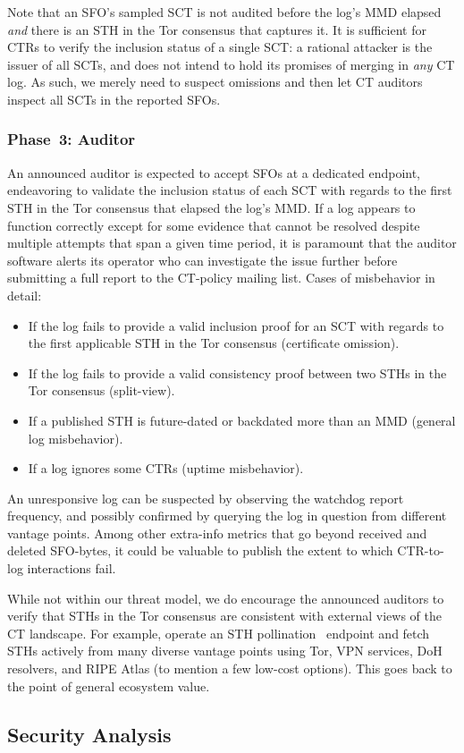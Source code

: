 Note that an SFO's sampled SCT is not audited before the log's MMD elapsed
\emph{and} there is an STH in the Tor consensus that captures it.  It is
sufficient for CTRs to verify the inclusion status of a single SCT:
	a rational attacker is the issuer of all SCTs, and
	does not intend to hold its promises of merging in \emph{any} CT log.
As such, we merely need to suspect omissions and then let CT auditors inspect
all SCTs in the reported SFOs.

\subsubsection{Phase~3: Auditor} \label{sec:auditor:design:auditor}
An announced auditor is expected to accept SFOs at a dedicated endpoint,
endeavoring to validate the inclusion status of each SCT with regards to the
first STH in the Tor consensus that elapsed the log's MMD.  If a log appears to
function correctly except for some evidence that cannot be
resolved despite multiple attempts that span a given time period, it is
paramount that the auditor software alerts its operator who can investigate
the issue further before submitting a full report to the CT-policy mailing list.
Cases of misbehavior in detail:
\begin{itemize}
	\item If the log fails to provide a valid inclusion proof for an SCT with
		regards to the first applicable STH in the Tor consensus
		(certificate omission).
	\item If the log fails to provide a valid consistency proof between two
		STHs in the Tor consensus
		(split-view).
	\item If a published STH is future-dated or backdated more than an MMD
		(general log misbehavior).
	\item If a log ignores some CTRs (uptime misbehavior).
\end{itemize}

An unresponsive log can be suspected by observing the watchdog report frequency,
and possibly confirmed by querying the log in question from different vantage
points.  Among other extra-info metrics that go beyond received and deleted
SFO-bytes, it could be valuable to publish the extent to which CTR-to-log
interactions fail.

While not within our threat model, we do encourage the announced auditors to
verify that STHs in the Tor consensus are consistent with external views of the
CT landscape.  For example, operate an STH pollination~\cite{nordberg} endpoint
and fetch STHs actively from many diverse vantage points using Tor, VPN
services, DoH resolvers, and RIPE Atlas (to mention a few low-cost options).
This goes back to the point of general ecosystem value.

\subsection{Security Analysis} \label{sec:auditor:design:analysis}
